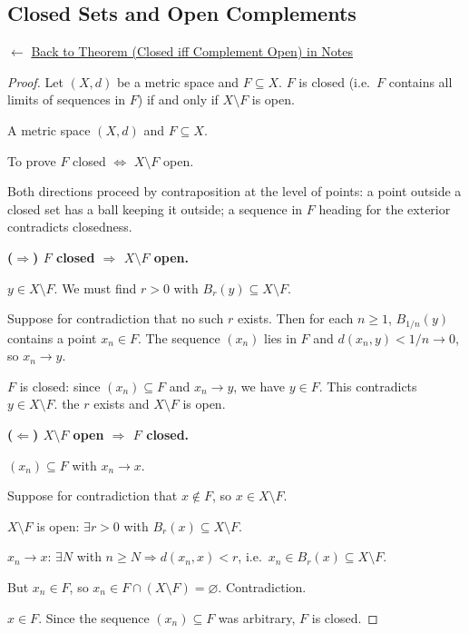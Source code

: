 
\subsection*{Closed Sets and Open Complements}
\label{prf:closed-iff-complement-open}

\begin{remark*}[Return]
$\leftarrow$ \hyperref[thm:closed-iff-complement-open]{Back to Theorem
(Closed iff Complement Open) in Notes}
\end{remark*}

\begin{proof}
\Claim Let $(X,d)$ be a metric space and $F \subseteq X$.
$F$ is closed (i.e.\ $F$ contains all limits of sequences in $F$)
if and only if $X \setminus F$ is open.

\Given A metric space $(X,d)$ and $F \subseteq X$.

\Goal To prove $F$ closed $\Longleftrightarrow$ $X \setminus F$ open.

\Strategy Both directions proceed by contraposition at the level of points:
a point outside a closed set has a ball keeping it outside;
a sequence in $F$ heading for the exterior contradicts closedness.

\medskip
\noindent\textbf{($\Rightarrow$) $F$ closed $\Rightarrow$ $X \setminus F$ open.}

\Let $y \in X \setminus F$. We must find $r > 0$ with $B_r(y) \subseteq X \setminus F$.

Suppose for contradiction that no such $r$ exists. Then for each $n \ge 1$,
$B_{1/n}(y)$ contains a point $x_n \in F$.
The sequence $(x_n)$ lies in $F$ and $d(x_n, y) < 1/n \to 0$, so $x_n \to y$.

\ByAss $F$ is closed: since $(x_n) \subseteq F$ and $x_n \to y$, we have $y \in F$.
This contradicts $y \in X \setminus F$. \Therefore the $r$ exists and $X \setminus F$ is open.

\medskip
\noindent\textbf{($\Leftarrow$) $X \setminus F$ open $\Rightarrow$ $F$ closed.}

\Let $(x_n) \subseteq F$ with $x_n \to x$.

Suppose for contradiction that $x \notin F$, so $x \in X \setminus F$.

\ByAss $X \setminus F$ is open: $\exists r > 0$ with $B_r(x) \subseteq X \setminus F$.

\ByAss $x_n \to x$: $\exists N$ with $n \ge N \Rightarrow d(x_n, x) < r$, i.e.\ $x_n \in B_r(x) \subseteq X \setminus F$.

But $x_n \in F$, so $x_n \in F \cap (X \setminus F) = \varnothing$. Contradiction.

\Therefore $x \in F$. Since the sequence $(x_n) \subseteq F$ was arbitrary, $F$ is closed. \AsReq
\end{proof}

